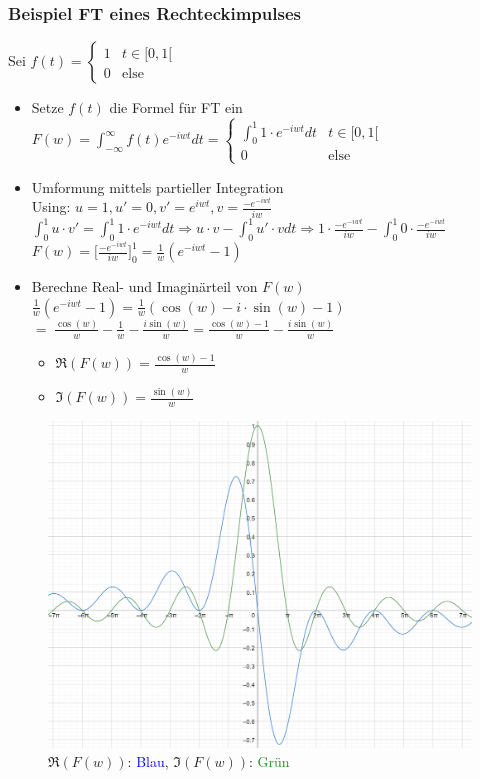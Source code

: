 \documentclass[12pt,a4paper]{article}
\newcommand{\blue}[1]{\textcolor{blue} {#1}}
\newcommand{\green}[1]{\textcolor{ForestGreen} {#1}}
\newcommand{\nl}{\\[0.1cm]}
\begin{document}
\subsubsection{Beispiel FT eines Rechteckimpulses}
Sei $f(t) = \begin{cases}1& t\in[0,1[ \\ 0&\text{else} \end{cases}$
\begin{itemize}
\item Setze $f(t)$ die Formel für FT ein\nl
$\displaystyle F(w) = \int_{-\infty}^{\infty} f(t) e^{-iwt} dt = \begin{cases} \displaystyle\int_0^1 1\cdot e^{-iwt} dt & t\in[0,1[ \\ 0 & \text{else} \end{cases}$
\item Umformung mittels partieller Integration\nl
Using: $u=1, u'=0, v'=e^{iwt}, v=\frac{-e^{-iwt}}{iw}$\nl
$\displaystyle \int_0^1 u\cdot v' = \int_0^1 1\cdot e^{-iwt} dt \Rightarrow u\cdot v - \int_0^1 u'\cdot v dt \Rightarrow 1\cdot \frac{-e^{-iwt}}{iw} - \int_0^1 0\cdot \frac{-e^{-iwt}}{iw}$\nl
$\displaystyle F(w) = \big[\frac{-e^{-iwt}}{iw}\big]^1_0 = \frac{1}{w}(e^{-iwt}-1)$
\item Berechne Real- und Imaginärteil von $F(w)$\nl
$\frac{1}{w}(e^{-iwt}-1) = \frac{1}{w}(\cos(w) - i\cdot \sin(w) -1)$\\
$=\;\frac{\cos(w)}{w} - \frac{1}{w} -\frac{i\sin(w)}{w} = \frac{\cos(w) -1 }{w} - \frac{i\sin(w)}{w}$\nl
\begin{itemize}
\item $\Re(F(w)) = \frac{\cos(w)-1}{w}$
\item $\Im(F(w)) = \frac{\sin(w)}{w}$
\end{itemize}
\end{itemize}
\begin{figure}[H]
\centering
\includegraphics[scale=0.2]{./resources/ft_res.png}
\caption{$\Re(F(w))$: \blue{Blau}, $\Im(F(w))$: \green{Grün}}
\end{figure}
\end{document}
